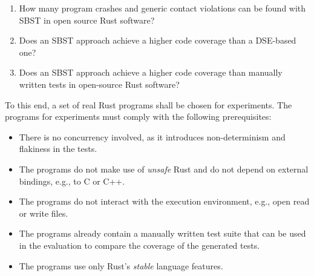 \documentclass{article}
\begin{document}

\begin{enumerate}[start=1, label={\bfseries RQ\arabic*:}]
    \item How many program crashes and generic contact violations can be found with \ac{SBST} in open source Rust software?
    \item Does an \ac{SBST} approach achieve a higher code coverage than a \ac{DSE}-based one?
    \item Does an \ac{SBST} approach achieve a higher code coverage than manually written tests in open-source Rust software?
\end{enumerate}
To this end, a set of real Rust programs shall be chosen for experiments. The programs for experiments must comply with the following prerequisites:
\begin{itemize}
    \item There is no concurrency involved, as it introduces non-determinism and flakiness in the tests.
    \item The programs do not make use of \textit{unsafe} Rust and do not depend on external bindings, e.g., to C or C++.
    \item The programs do not interact with the execution environment, e.g., open read or write files.
    \item The programs already contain a manually written test suite that can be used in the evaluation to compare the coverage of the generated tests. 
    \item The programs use only Rust's \textit{stable} language features.
\end{itemize}
\end{document}
